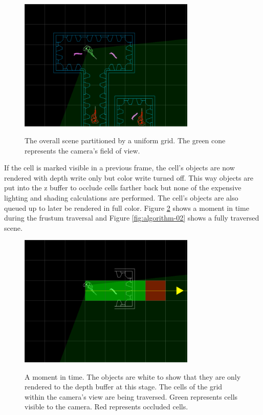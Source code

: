 \documentclass[12pt]{ucthesis}
\newcommand{\captionfonts}{\small\bf\ssp}
\begin{document}
\begin{figure}
\begin{center}
\includegraphics[width=0.75\textwidth]{Images/sceneAlgorithm/00.png}
\captionfonts
\caption[A Scene]{The overall scene partitioned by a uniform grid.  The green cone represents the camera's field of view.}
\label{fig:algorithm-00}
\end{center}
\end{figure}

If the cell is marked visible in a previous frame, the cell's objects are now rendered with depth write only but color write turned off.
This way objects are put into the z buffer to occlude cells farther back but none of the expensive lighting and shading calculations are performed.
The cell's objects are also queued up to later be rendered in full color.
Figure \ref{fig:algorithm-01} shows a moment in time during the frustum traversal and Figure \ref{fig:algorithm-02} shows a fully traversed scene.

\begin{figure}
\begin{center}
\includegraphics[width=0.75\textwidth]{Images/sceneAlgorithm/01.png}
\captionfonts
\caption[Traversing The Camera View]{A moment in time.  The objects are white to show that they are only rendered to the depth buffer at this stage.  The cells of the grid within the camera's view are being traversed.  Green represents cells visible to the camera.  Red represents occluded cells.}
\label{fig:algorithm-01}
\end{center}
\end{figure}
\end{document}
